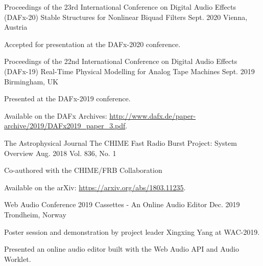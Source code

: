 

\begin{cventries}

  \cventry
    {Proceedings of the 23rd International Conference on Digital Audio Effects (DAFx-20)} %
    {Stable Structures for Nonlinear Biquad Filters} %
    {Sept. 2020} %
    {Vienna, Austria} %
    {
      \begin{cvitems} %
        \item {Accepted for presentation at the DAFx-2020 conference.}
      \end{cvitems}
    }

  \cventry
    {Proceedings of the 22nd International Conference on Digital Audio Effects (DAFx-19)} %
    {Real-Time Physical Modelling for Analog Tape Machines} %
    {Sept. 2019} %
    {Birmingham, UK} %
    {
      \begin{cvitems} %
        \item {Presented at the DAFx-2019 conference.}
        \item {Available on the DAFx Archives: \url{http://www.dafx.de/paper-archive/2019/DAFx2019_paper_3.pdf}.}
      \end{cvitems}
    }

    \cventry
    {The Astrophysical Journal} %
    {The CHIME Fast Radio Burst Project: System Overview} %
    {Aug. 2018} %
    {Vol. 836, No. 1} %
    {
      \begin{cvitems} %
        \item {Co-authored with the CHIME/FRB Collaboration}
        \item {Available on the arXiv: \url{https://arxiv.org/abs/1803.11235}.}
      \end{cvitems}
    }

    \cventry
    {Web Audio Conference 2019} %
    {Cassettes - An Online Audio Editor} %
    {Dec. 2019} %
    {Trondheim, Norway} %
    {
      \begin{cvitems} %
        \item {Poster session and demonstration by project leader Xingxing Yang
               at WAC-2019.}
        \item {Presented an online audio editor built with the Web Audio API and Audio Worklet.}
      \end{cvitems}
    }

\end{cventries}
